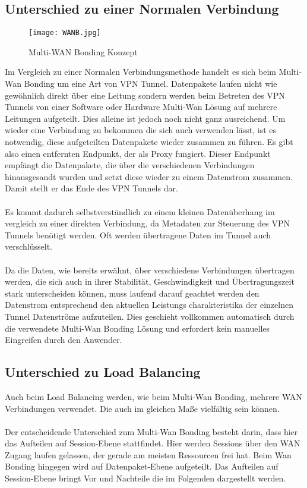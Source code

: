 \subsection{Unterschied zu einer Normalen Verbindung}
\begin{figure}[h]
    \centering
    \texttt{[image: WANB.jpg]}
    \caption[Multi-WAN Bonding Konzept]{Multi-WAN Bonding Konzept}%
\end{figure}
Im Vergleich zu einer Normalen Verbindungsmethode handelt es sich beim Multi-Wan Bonding um eine Art von VPN Tunnel. Datenpakete laufen nicht wie gewöhnlich direkt über eine Leitung sondern werden beim Betreten des VPN Tunnels von einer Software oder Hardware Multi-Wan Lösung auf mehrere Leitungen aufgeteilt. Dies alleine ist jedoch noch nicht ganz ausreichend. Um wieder eine Verbindung zu bekommen die sich auch verwenden lässt, ist es notwendig, diese aufgeteilten Datenpakete wieder zusammen zu führen. Es gibt also einen entfernten Endpunkt, der als Proxy fungiert. Dieser Endpunkt empfängt die Datenpakete, die über die verschiedenen Verbindungen hinausgesandt wurden und setzt diese wieder zu einem Datenstrom zusammen. Damit stellt er das Ende des VPN Tunnels dar. 
\\\\
Es kommt dadurch selbstverständlich zu einem kleinen Datenüberhang im vergleich zu einer direkten Verbindung, da Metadaten zur Steuerung des VPN Tunnels benötigt werden. Oft werden übertragene Daten im Tunnel auch verschlüsselt.
\\\\
Da die Daten, wie bereits erwähnt, über verschiedene Verbindungen übertragen werden, die sich auch in ihrer Stabilität, Geschwindigkeit und Übertragungszeit stark unterscheiden können, muss laufend darauf geachtet werden den Datenstrom entsprechend den aktuellen Leistungs charakteristika der einzelnen Tunnel Datenströme aufzuteilen. Dies geschieht vollkommen automatisch durch die verwendete Multi-Wan Bonding Lösung und erfordert kein manuelles Eingreifen durch den Anwender.

\subsection{Unterschied zu Load Balancing}
Auch beim Load Balancing werden, wie beim Multi-Wan Bonding, mehrere WAN Verbindungen verwendet. Die auch im gleichen Maße vielfältig sein können.
\\\\
Der entscheidende Unterschied zum Multi-Wan Bonding besteht darin, dass hier das Aufteilen auf Session-Ebene stattfindet. Hier werden Sessions über den WAN Zugang laufen gelassen, der gerade am meisten Ressourcen frei hat. Beim Wan Bonding hingegen wird auf Datenpaket-Ebene aufgeteilt. Das Aufteilen auf Session-Ebene bringt Vor und Nachteile die im Folgenden dargestellt werden.
